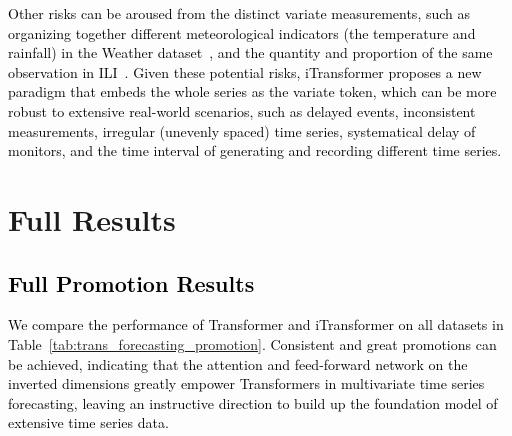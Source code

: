 \documentclass{article} %
\newcommand{\update}[1]{{\textcolor{black}{#1}}}
\begin{document}
\update{Other risks can be aroused from the distinct variate measurements, such as organizing together different meteorological indicators (the temperature and rainfall) in the Weather dataset~\citep{Autoformer}, and the quantity and proportion of the same observation in ILI~\citep{Timesnet}. Given these potential risks, iTransformer proposes a new paradigm that embeds the whole series as the variate token, which can be more robust to extensive real-world scenarios, such as delayed events, inconsistent measurements, irregular (unevenly spaced) time series, systematical delay of monitors, and the time interval of generating and recording different time series. 
}



\section{Full Results}
\subsection{\update{Full Promotion Results}}
\update{We compare the performance of Transformer and iTransformer on all datasets in Table~\ref{tab:trans_forecasting_promotion}. Consistent and great promotions can be achieved, indicating that the attention and feed-forward network on the inverted dimensions greatly empower Transformers in multivariate time series forecasting, leaving an instructive direction to build up the foundation model of extensive time series data.}
\end{document}

